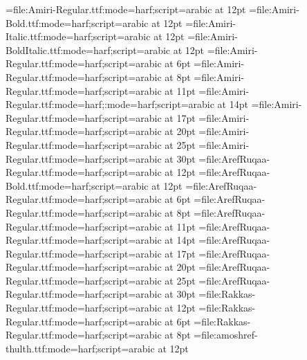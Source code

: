 


\font\amiri={file:Amiri-Regular.ttf:mode=harf;script=arabic} at 12pt
\font\amiribf={file:Amiri-Bold.ttf:mode=harf;script=arabic} at 12pt
\font\amiriit={file:Amiri-Italic.ttf:mode=harf;script=arabic} at 12pt
\font\amiribi={file:Amiri-BoldItalic.ttf:mode=harf;script=arabic} at 12pt
\font\amiritiny={file:Amiri-Regular.ttf:mode=harf;script=arabic} at 6pt
\font\amiriscriptsize={file:Amiri-Regular.ttf:mode=harf;script=arabic} at 8pt
\font\amirismall={file:Amiri-Regular.ttf:mode=harf;script=arabic} at 11pt
\font\amirilarge={file:Amiri-Regular.ttf:mode=harf;:mode=harf;script=arabic} at 14pt
\font\amiriLarge={file:Amiri-Regular.ttf:mode=harf;script=arabic} at 17pt
\font\amiriLARGE={file:Amiri-Regular.ttf:mode=harf;script=arabic} at 20pt
\font\amirihuge={file:Amiri-Regular.ttf:mode=harf;script=arabic} at 25pt
\font\amiriHuge={file:Amiri-Regular.ttf:mode=harf;script=arabic} at 30pt
\font\arefruqaa={file:ArefRuqaa-Regular.ttf:mode=harf;script=arabic} at 12pt
\font\arefruqaabf={file:ArefRuqaa-Bold.ttf:mode=harf;script=arabic} at 12pt
\font\arefruqaatiny={file:ArefRuqaa-Regular.ttf:mode=harf;script=arabic} at 6pt
\font\arefruqaascriptsize={file:ArefRuqaa-Regular.ttf:mode=harf;script=arabic} at 8pt
\font\arefruqaasmall={file:ArefRuqaa-Regular.ttf:mode=harf;script=arabic} at 11pt
\font\arefruqaalarge={file:ArefRuqaa-Regular.ttf:mode=harf;script=arabic} at 14pt
\font\arefruqaaLarge={file:ArefRuqaa-Regular.ttf:mode=harf;script=arabic} at 17pt
\font\arefruqaaLARGE={file:ArefRuqaa-Regular.ttf:mode=harf;script=arabic} at 20pt
\font\arefruqaahuge={file:ArefRuqaa-Regular.ttf:mode=harf;script=arabic} at 25pt
\font\arefruqaaHuge={file:ArefRuqaa-Regular.ttf:mode=harf;script=arabic} at 30pt
\font\rakkas={file:Rakkas-Regular.ttf:mode=harf;script=arabic} at 12pt
\font\rakkastiny={file:Rakkas-Regular.ttf:mode=harf;script=arabic} at 6pt
\font\rakkasscriptsize={file:Rakkas-Regular.ttf:mode=harf;script=arabic} at 8pt
\font\amoshrefthulth={file:amoshref-thulth.ttf:mode=harf;script=arabic} at 12pt
